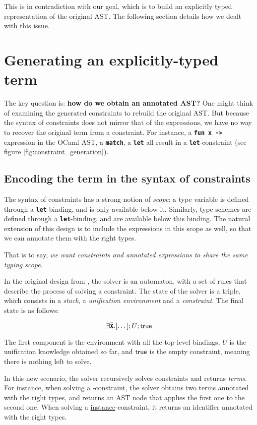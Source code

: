 \documentclass[10pt,a4paper,twoside,titlepage,twocolumn]{article}
\newcommand{\code}[1]{\textbf{\texttt{#1}}}
\begin{document}
This is in contradiction with our goal, which is to build an explicitly typed
representation of the original AST. The following section details how we dealt
with this issue.

\section{Generating an explicitly-typed term}

The key question is: \textbf{how do we obtain an annotated AST?} One might think
of examining the generated constraints to rebuild the original AST. But because
the syntax of constraints does not mirror that of the expressions, we have no
way to recover the original term from a constraint. For instance, a \code{fun x
->} expression in the OCaml AST, a \code{match}, a \code{let}
all result in a \code{let}-constraint (see figure
\vref{fig:constraint_generation}).

\subsection{Encoding the term in the syntax of constraints}

The syntax of constraints has a strong notion of \emph{scope}: a type variable is
defined through a \code{let}-binding, and is only available below it. Similarly,
type schemes are defined through a \code{let}-binding, and are available below
this binding. The natural extension of this design is to include the expressions
in this scope as well, so that we can annotate them with the right types.

That is to say, \emph{we want constraints and annotated expressions to share the
same typing scope}.

In the original design from \cite{pottier2005essence}, the solver is an
automaton, with a set of rules that describe the process of solving a
constraint. The state of the solver is a triple, which consists in a
\emph{stack}, a \emph{unification environment} and a \emph{constraint}. The
final state is as follows:

$$\cexists\tvars[\dots]; U; \ctrue$$

The first component is the environment with all the top-level bindings, $U$ is
the unification knowledge obtained so far, and $\text{\textsf{true}}$ is the empty constraint,
meaning there is nothing left to solve.

In this new scenario, the solver recursively solves constraints and returns
\emph{terms}. For instance, when solving a \underline{}-constraint,
the solver obtains two terms annotated with the right types, and returns an AST
node that applies the first one to the second one. When solving a
\underline{instance}-constraint, it returns an identifier annotated with the
right types. 
\end{document}
